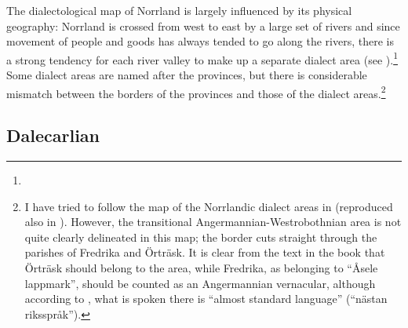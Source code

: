 The dialectological map of Norrland is largely influenced by its physical geography: Norrland is crossed from west to east by a large set of rivers and since movement of people and goods has always tended to go along the rivers, there is a strong tendency for each river valley to make up a separate dialect area (see ).\footnote{ } Some dialect areas are named after the provinces, but there is considerable mismatch between the borders of the provinces and those of the dialect areas.\footnote{ I have tried to follow the map of the Norrlandic dialect areas in \citet[230]{ÅgrenEtAl1954} (reproduced also in \citet{Dahlstedt1971}). However, the transitional Angermannian-Westrobothnian area is not quite clearly delineated in this map; the border cuts straight through the parishes of Fredrika and Örträsk. It is clear from the text in the book that Örträsk should belong to the area, while Fredrika, as belonging to “Åsele lappmark”, should be counted as an Angermannian vernacular, although according to \citet[289]{ÅgrenEtAl1954}, what is spoken there is “almost standard language” (“nästan riksspråk”). } 

\subsection{ Dalecarlian}

